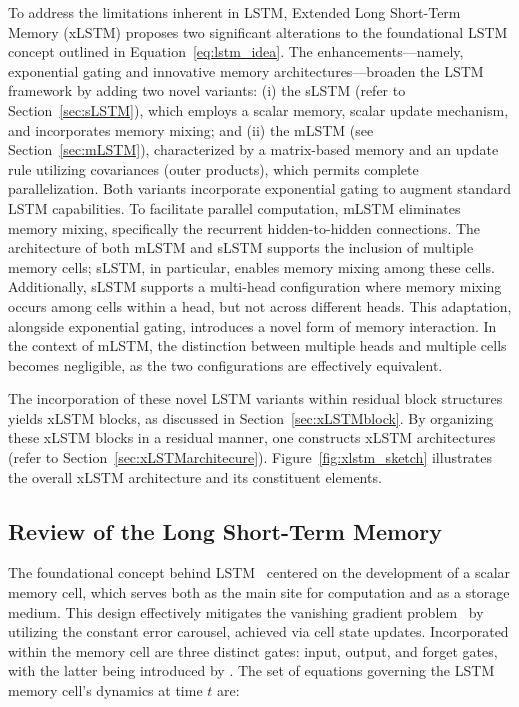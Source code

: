 To address the limitations inherent in LSTM, Extended Long Short-Term Memory (xLSTM) proposes two significant alterations to the foundational LSTM concept outlined in Equation~\eqref{eq:lstm_idea}. The enhancements---namely, exponential gating and innovative memory architectures---broaden the LSTM framework by adding two novel variants: (i) the sLSTM (refer to Section~\ref{sec:sLSTM}), which employs a scalar memory, scalar update mechanism, and incorporates memory mixing; and (ii) the mLSTM (see Section~\ref{sec:mLSTM}), characterized by a matrix-based memory and an update rule utilizing covariances (outer products), which permits complete parallelization. Both variants incorporate exponential gating to augment standard LSTM capabilities. To facilitate parallel computation, mLSTM eliminates memory mixing, specifically the recurrent hidden-to-hidden connections. The architecture of both mLSTM and sLSTM supports the inclusion of multiple memory cells; sLSTM, in particular, enables memory mixing among these cells. Additionally, sLSTM supports a multi-head configuration where memory mixing occurs among cells within a head, but not across different heads. This adaptation, alongside exponential gating, introduces a novel form of memory interaction. In the context of mLSTM, the distinction between multiple heads and multiple cells becomes negligible, as the two configurations are effectively equivalent.

The incorporation of these novel LSTM variants within residual block structures yields xLSTM blocks, as discussed in Section~\ref{sec:xLSTMblock}. By organizing these xLSTM blocks in a residual manner, one constructs xLSTM architectures (refer to Section~\ref{sec:xLSTMarchitecure}). Figure~\ref{fig:xlstm_sketch} illustrates the overall xLSTM architecture and its constituent elements.

\subsection{Review of the Long Short-Term Memory}
\label{sec:orgLSTM}

The foundational concept behind LSTM~\citep{Hochreiter:91,Hochreiter:97nips,Hochreiter:97} centered on the development of a scalar memory cell, which serves both as the main site for computation and as a storage medium. This design effectively mitigates the vanishing gradient problem~\citep{Hochreiter:91,Hochreiter:00book} by utilizing the constant error carousel, achieved via cell state updates. Incorporated within the memory cell are three distinct gates: input, output, and forget gates, with the latter being introduced by \citet{Gers:00}. The set of equations governing the LSTM memory cell’s dynamics at time $t$ are:


